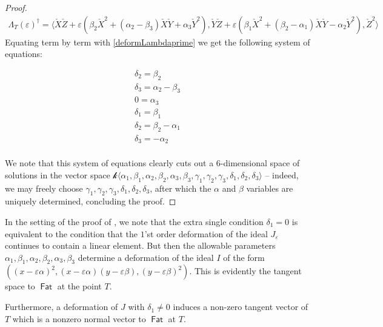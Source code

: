 \documentclass{article}
\renewcommand{\k}{\mathscr{k}}
\DeclareMathOperator{\Fat}{\mathsf{Fat}}
\begin{document}
\begin{proof}
\begin{eqnarray*}
    \Lambda_{T}(\varepsilon)^{\dagger} = \langle \check{X}\check{Z} + \varepsilon(\beta_{2}\check{X}^{2} + (\alpha_{2}-\beta_{3})\check{X}\check{Y} + \alpha_{3}\check{Y}^{2}), \check{Y}\check{Z} + \varepsilon(\beta_{1}\check{X}^{2}+(\beta_{2}-\alpha_{1})\check{X}\check{Y} - \alpha_{2}\check{Y}^{2}), \check{Z}^{2} \rangle
\end{eqnarray*}
Equating term by term with \eqref{deformLambdaprime} we get the following system of equations:


\begin{eqnarray*}\label{SystemOfEquations}
  \delta_{2} =\beta_{2}\\
  \delta_{3} = \alpha_{2}-\beta_{3}\\
  0 = \alpha_{3}\\
  \delta_{1} = \beta_{1}\\
   \delta_{2} = \beta_{2}-\alpha_{1}\\
  \delta_{3} = -\alpha_{2}\\
\end{eqnarray*}

We note that this system of equations clearly cuts out a
$6$-dimensional space of solutions in the vector space
$\k\langle \alpha_{1}, \beta_{1}, \alpha_{2}, \beta_{2}, \alpha_{3},
\beta_{3}, \gamma_{1}, \gamma_{2}, \gamma_{3}, \delta_{1}, \delta_{2},
\delta_{3} \rangle$ -- indeed, we may freely choose
$\gamma_{1}, \gamma_{2}, \gamma_{3}, \delta_{1}, \delta_{2},
\delta_{3} $, after which the $\alpha$ and $\beta$ variables are
uniquely determined, concluding the proof.
\end{proof}


\begin{remark}
\label{remark:delta1transversality} In the setting of the proof of , we note that the extra single condition $\delta_{1} = 0$ is equivalent to the condition that the $1$'st order deformation of the ideal $J_{\varepsilon}$ continues to contain a linear element.  But then the allowable parameters $\alpha_{1}, \beta_{1}, \alpha_{2}, \beta_{2}, \alpha_{3}, \beta_{3}$ determine a deformation of the ideal $I$ of the form $((x-\varepsilon \alpha)^{2}, (x - \varepsilon \alpha)(y - \varepsilon \beta), (y - \varepsilon \beta)^{2})$.  This is evidently the tangent space to $\Fat$ at the point $T$.

Furthermore, a deformation of $J$ with $\delta_{1} \neq 0$ induces a non-zero tangent vector of $T$ which is a nonzero normal vector to $\Fat$ at $T$.
\end{remark} 
\end{document}

